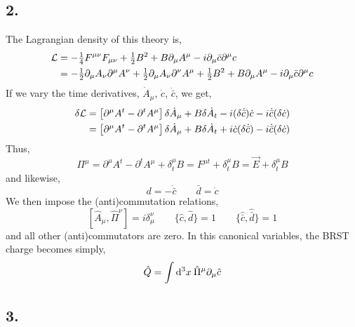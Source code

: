 \documentclass[12pt]{article}
\begin{document}
\subsection*{2.}

The Lagrangian density of this theory is,
\begin{align*}
\mathcal{L} & = - \tfrac{1}{4} F^{\mu \nu} F_{\mu \nu}  + \tfrac{1}{2} B^2 + B \partial_\mu A^{\mu} - i \partial_\mu \bar{c} \partial^\mu c 
\\
& = - \tfrac{1}{2} \partial_\mu A_\nu \partial^\mu A^\nu + \tfrac{1}{2} \partial_\mu A_\nu \partial^\nu A^\mu  + \tfrac{1}{2} B^2 + B \partial_\mu A^{\mu} - i \partial_\mu \bar{c} \partial^\mu c 
\end{align*}
If we vary the time derivatives, $\dot{A}_\mu$, $\dot{c}$, $\dot{\bar{c}}$, we get,  
\begin{align*}
\delta \mathcal{L} & = \left[  \partial^\mu A^t  - \partial^t A^\mu  \right] \delta \dot{A}_\mu + B \delta \dot{A}_t - i (\delta \dot{\bar{c}}) \dot{c} - i \dot{\bar{c}} (\delta \dot{c}) 
\\
& = \left[  \partial^\mu A^t  - \partial^t A^\mu  \right] \delta \dot{A}_\mu + B \delta \dot{A}_t + i \dot{c} (\delta \dot{\bar{c}}) - i \dot{\bar{c}} (\delta \dot{c}) 
\end{align*}
Thus,
\[ \Pi^\mu = \partial^\mu A^t - \partial^t A^\mu + \delta^\mu_t B = F^{\mu t} + \delta^\mu_t B = \vec{E} + \delta^\mu_t B \]
and likewise,
\[ d = - \dot{\bar{c}} \quad \quad  \bar{d} = \dot{c} \]
We then impose the (anti)commutation relations,
\[ \left[ \hat{A}_\mu, \hat{\Pi}^\nu \right] = i \delta_\mu^\nu \quad  \quad \{ \hat{c}, \hat{d} \} = 1 \quad \quad  \{ \hat{\bar{c}}, \hat{\bar{d}} \} = 1 \]
and all other (anti)commutators are zero.
In this canonical variables, the BRST charge becomes simply,
\[ \hat{Q} = \int \mathrm{d}^{3} x \: \hat{\Pi}^\mu \partial_\mu \hat{c} \]

\subsection*{3.}
\end{document}
